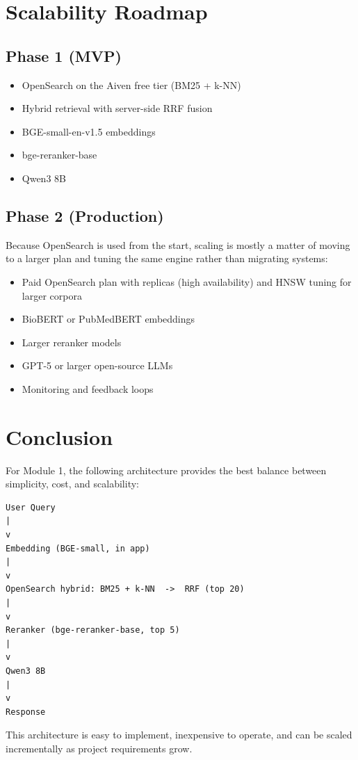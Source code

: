 \documentclass[11pt,a4paper]{article}
\begin{document}
\section{Scalability Roadmap}

\subsection{Phase 1 (MVP)}

\begin{itemize}
    \item OpenSearch on the Aiven free tier (BM25 + k-NN)
    \item Hybrid retrieval with server-side RRF fusion
    \item BGE-small-en-v1.5 embeddings
    \item bge-reranker-base
    \item Qwen3 8B
\end{itemize}

\subsection{Phase 2 (Production)}

Because OpenSearch is used from the start, scaling is mostly a matter of moving
to a larger plan and tuning the same engine rather than migrating systems:

\begin{itemize}
    \item Paid OpenSearch plan with replicas (high availability) and HNSW tuning
          for larger corpora
    \item BioBERT or PubMedBERT embeddings
    \item Larger reranker models
    \item GPT-5 or larger open-source LLMs
    \item Monitoring and feedback loops
\end{itemize}

\section{Conclusion}

For Module 1, the following architecture provides the best balance between simplicity, cost, and scalability:

\begin{verbatim}
User Query
|
v
Embedding (BGE-small, in app)
|
v
OpenSearch hybrid: BM25 + k-NN  ->  RRF (top 20)
|
v
Reranker (bge-reranker-base, top 5)
|
v
Qwen3 8B
|
v
Response
\end{verbatim}

This architecture is easy to implement, inexpensive to operate, and can be scaled incrementally as project requirements grow.
\end{document}
